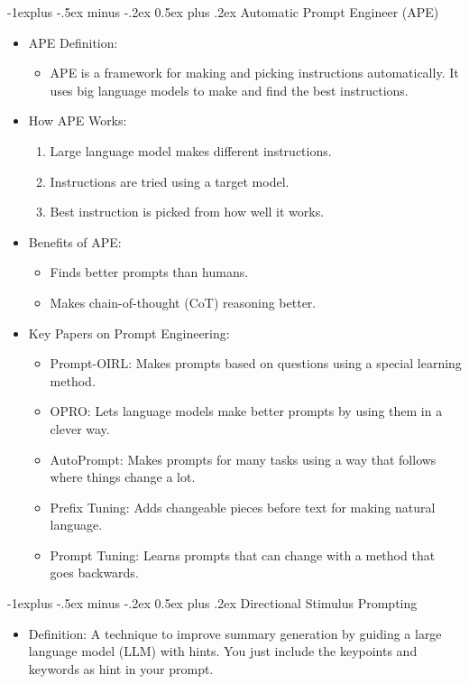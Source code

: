 \documentclass[10pt,landscape]{article}
\makeatletter
\renewcommand{\subsection}{\@startsection{subsection}{2}{0mm}%
                                {-1explus -.5ex minus -.2ex}%
                                {0.5ex plus .2ex}%
                                {\normalfont\normalsize\bfseries}}
\makeatother
\begin{document}
\begin{multicols}{3}
\subsection{Automatic Prompt Engineer (APE)}
\begin{itemize}
    \item APE Definition:
    \begin{itemize}
        \item APE is a framework for making and picking instructions automatically. It uses big language models to make and find the best instructions.
    \end{itemize}
    \item How APE Works:
    \begin{enumerate}
        \item Large language model makes different instructions.
        \item Instructions are tried using a target model.
        \item Best instruction is picked from how well it works.
    \end{enumerate}
    \item Benefits of APE:
    \begin{itemize}
        \item Finds better prompts than humans.
        \item Makes chain-of-thought (CoT) reasoning better.
    \end{itemize}
    \item Key Papers on Prompt Engineering:
    \begin{itemize}
        \item Prompt-OIRL: Makes prompts based on questions using a special learning method.
        \item OPRO: Lets language models make better prompts by using them in a clever way.
        \item AutoPrompt: Makes prompts for many tasks using a way that follows where things change a lot.
        \item Prefix Tuning: Adds changeable pieces before text for making natural language.
        \item Prompt Tuning: Learns prompts that can change with a method that goes backwards.
    \end{itemize}
\end{itemize}

\subsection{Directional Stimulus Prompting}
\begin{itemize}
    \item Definition: A technique to improve summary generation by guiding a large language model (LLM) with hints. You just include the keypoints and keywords as hint in your prompt.
\end{itemize}


\end{multicols}
\end{document}
